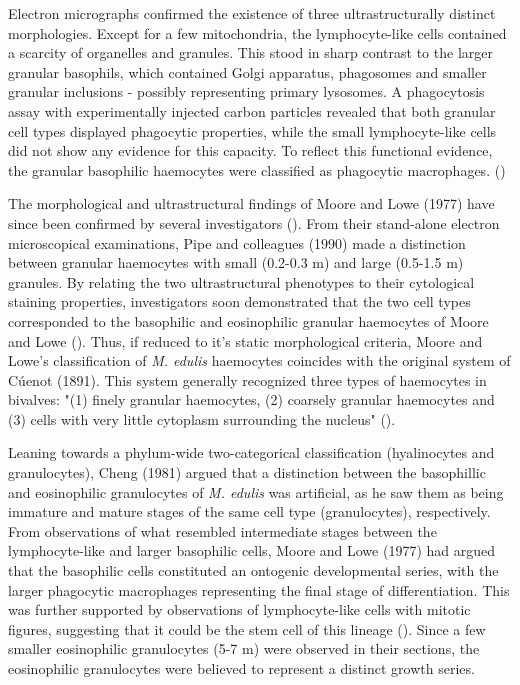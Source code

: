 Electron micrographs confirmed the existence of three ultrastructurally distinct morphologies. Except for a few mitochondria, the lymphocyte-like cells contained a scarcity of organelles and granules. This stood in sharp contrast to the larger granular basophils, which contained Golgi apparatus, phagosomes and smaller granular inclusions - possibly representing primary lysosomes. A phagocytosis assay with experimentally injected carbon particles revealed that both granular cell types displayed phagocytic properties, while the small lymphocyte-like cells did not show any evidence for this capacity. To reflect this functional evidence, the granular basophilic haemocytes were classified as phagocytic macrophages. (\cite{Moore1977})

The morphological and ultrastructural findings of Moore and Lowe (1977) have since been confirmed by several investigators (\cite{Rasmussen1985, Renwartz1990, Pipe1990, Noel1994, Pipe1997, Wootton2003}). From their stand-alone electron microscopical examinations, Pipe and colleagues (1990) made a distinction between granular haemocytes with small (0.2-0.3 \micro m) and large (0.5-1.5 \micro m) granules. By relating the two ultrastructural phenotypes to their cytological staining properties, investigators soon demonstrated that the two cell types corresponded to the basophilic and eosinophilic granular haemocytes of Moore and Lowe (\cite{Pipe1990, Noel1994}). Thus, if reduced to it's static morphological criteria, Moore and Lowe's classification of \emph{M. edulis} haemocytes coincides with the original system of Cúenot (1891). This system generally recognized three types of haemocytes in bivalves: "(1) finely granular haemocytes, (2) coarsely granular haemocytes and (3) cells with very little cytoplasm surrounding the nucleus" (\cite{Cheng1984}). 

Leaning towards a phylum-wide two-categorical classification (hyalinocytes and granulocytes), Cheng (1981) argued that a distinction between the basophillic and eosinophilic granulocytes of \emph{M. edulis} was artificial, as he saw them as being immature and mature stages of the same cell type (granulocytes), respectively. From observations of what resembled intermediate stages between the lymphocyte-like and larger basophilic cells, Moore and Lowe (1977) had argued that the basophilic cells constituted an ontogenic developmental series, with the larger phagocytic macrophages representing the final stage of differentiation. This was further supported by observations of lymphocyte-like cells with mitotic figures, suggesting that it could be the stem cell of this lineage (\cite{Moore1977}). Since a few smaller eosinophilic granulocytes (5-7 \micro m) were observed in their sections, the eosinophilic granulocytes were believed to represent a distinct growth series.

